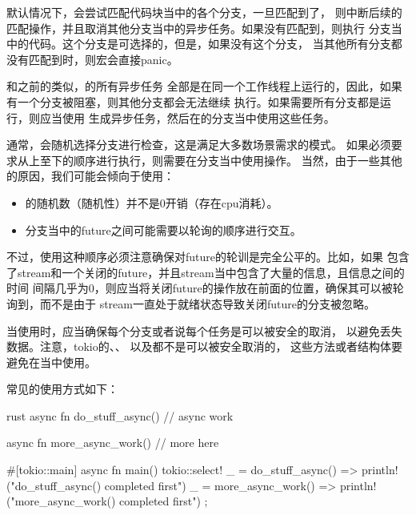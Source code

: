 默认情况下，会尝试匹配代码块当中的各个分支，一旦匹配到了，
则中断后续的匹配操作，并且取消其他分支当中的异步任务。如果没有匹配到，则执行
分支当中的代码。这个分支是可选择的，但是，如果没有这个分支，
当其他所有分支都没有匹配到时，则宏会直接panic。

和之前的类似，的所有异步任务
全部是在同一个工作线程上运行的，因此，如果有一个分支被阻塞，则其他分支都会无法继续
执行。如果需要所有分支都是运行，则应当使用
生成异步任务，然后在的分支当中使用这些任务。

通常，会随机选择分支进行检查，这是满足大多数场景需求的模式。
如果必须要求从上至下的顺序进行执行，则需要在分支当中使用操作。
当然，由于一些其他的原因，我们可能会倾向于使用：
\begin{itemize}
    \item {}的随机数（随机性）并不是0开销（存在cpu消耗）。
    \item 分支当中的future之间可能需要以轮询的顺序进行交互。
\end{itemize}

不过，使用这种顺序必须注意确保对future的轮训是完全公平的。比如，如果
包含了stream和一个关闭的future，并且stream当中包含了大量的信息，且信息之间的时间
间隔几乎为0，则应当将关闭future的操作放在前面的位置，确保其可以被轮询到，而不是由于
stream一直处于就绪状态导致关闭future的分支被忽略。

当使用时，应当确保每个分支或者说每个任务是可以被安全的取消，
以避免丢失数据。注意，tokio的、、
以及都不是可以被安全取消的，
这些方法或者结构体要避免在当中使用。

常见的使用方式如下：
\begin{code-block}{rust}
async fn do_stuff_async() {
    // async work
}

async fn more_async_work() {
    // more here
}

#[tokio::main]
async fn main() {
    tokio::select! {
        _ = do_stuff_async() => {
            println!("do_stuff_async() completed first")
        }
        _ = more_async_work() => {
            println!("more_async_work() completed first")
        }
    };
}
\end{code-block}

